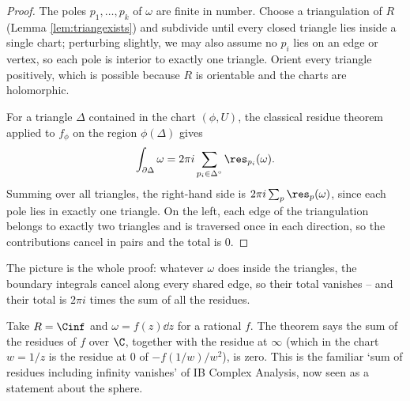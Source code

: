 \begin{proof}
	The poles $p_1,\dots,p_k$ of $\omega$ are finite in number. Choose a triangulation of
	$R$ (Lemma \ref{lem:triangexists}) and subdivide until every closed triangle lies
	inside a single chart; perturbing slightly, we may also assume no $p_i$ lies on an edge
	or vertex, so each pole is interior to exactly one triangle. Orient every triangle
	positively, which is possible because $R$ is orientable and the charts are
	holomorphic.

	For a triangle $\Delta$ contained in the chart $(\phi, U)$, the classical residue
	theorem applied to $f_\phi$ on the region $\phi(\Delta)$ gives
	$$
	\int_{\partial\Delta}\omega = 2\pi i \sum_{p_i \in \Delta^\circ}\res_{p_i}(\omega).
	$$
	Summing over all triangles, the right-hand side is $2\pi i \sum_p \res_p(\omega)$,
	since each pole lies in exactly one triangle. On the left, each edge of the
	triangulation belongs to exactly two triangles and is traversed once in each direction,
	so the contributions cancel in pairs and the total is $0$.
\end{proof}

\begin{center}
\end{center}

The picture is the whole proof: whatever $\omega$ does inside the triangles, the boundary
integrals cancel along every shared edge, so their total vanishes -- and their total is
$2\pi i$ times the sum of all the residues.

\begin{example}
	Take $R = \Cinf$ and $\omega = f(z)\dd z$ for a rational $f$. The theorem says the sum
	of the residues of $f$ over $\C$, together with the residue at $\infty$ (which in the
	chart $w = 1/z$ is the residue at $0$ of $-f(1/w)/w^2$), is zero. This is the familiar
	`sum of residues including infinity vanishes' of IB Complex Analysis, now seen as a
	statement about the sphere.
\end{example}

